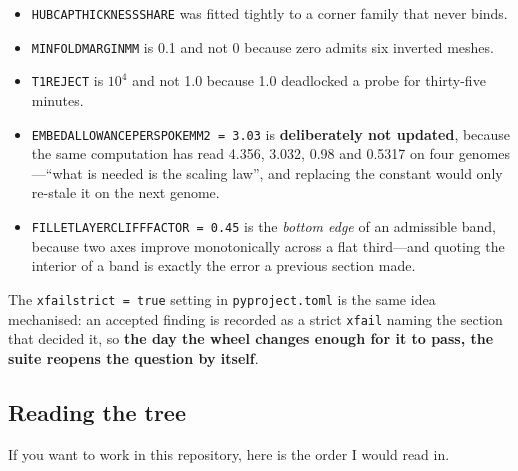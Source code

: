 \documentclass[11pt,a4paper]{article}
\DeclareRobustCommand{\code}[1]{%
  \texttt{\small\def\_{\textunderscore\discretionary{}{}{}}#1}}
\begin{document}
\begin{itemize}
\item \code{HUB\_CAP\_THICKNESS\_SHARE} was fitted tightly to a corner family that never
  binds.
\item \code{MIN\_FOLD\_MARGIN\_MM} is 0.1 and not 0 because zero admits six inverted
  meshes.
\item \code{T1\_REJECT} is $10^4$ and not 1.0 because 1.0 deadlocked a probe for
  thirty-five minutes.
\item \code{EMBED\_ALLOWANCE\_PER\_SPOKE\_MM2 = 3.03} is \textbf{deliberately not
  updated}, because the same computation has read 4.356, 3.032, 0.98 and 0.5317 on four
  genomes---``what is needed is the scaling law'', and replacing the constant would only
  re-stale it on the next genome.
\item \code{FILLET\_LAYER\_CLIFF\_FACTOR = 0.45} is the \emph{bottom edge} of an
  admissible band, because two axes improve monotonically across a flat third---and
  quoting the interior of a band is exactly the error a previous section made.
\end{itemize}

The \code{xfail\_strict = true} setting in \code{pyproject.toml} is the same idea
mechanised: an accepted finding is recorded as a strict \code{xfail} naming the section
that decided it, so \textbf{the day the wheel changes enough for it to pass, the suite
reopens the question by itself}.

\subsection{Reading the tree}

If you want to work in this repository, here is the order I would read in.
\end{document}
